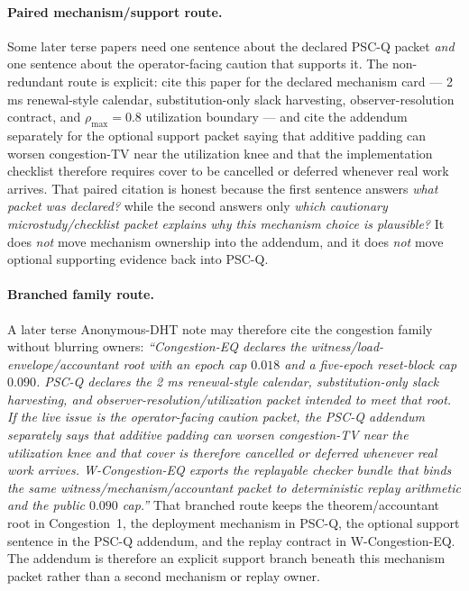 \documentclass[11pt]{article}
\theoremstyle{definition}
\theoremstyle{remark}
\begin{document}
\paragraph{Paired mechanism/support route.}
Some later terse papers need one sentence about the declared PSC-Q packet \emph{and} one sentence about the operator-facing caution that supports it.
The non-redundant route is explicit: cite this paper for the declared mechanism card --- 2 ms renewal-style calendar, substitution-only slack harvesting, observer-resolution contract, and $\rho_{\max}=0.8$ utilization boundary --- and cite the addendum separately for the optional support packet saying that additive padding can worsen congestion-TV near the utilization knee and that the implementation checklist therefore requires cover to be cancelled or deferred whenever real work arrives.\cite{series:pscqaddendum}
That paired citation is honest because the first sentence answers \emph{what packet was declared?} while the second answers only \emph{which cautionary microstudy/checklist packet explains why this mechanism choice is plausible?}
It does \emph{not} move mechanism ownership into the addendum, and it does \emph{not} move optional supporting evidence back into PSC-Q.

\paragraph{Branched family route.}
A later terse Anonymous-DHT note may therefore cite the congestion family without blurring owners: \emph{``Congestion-EQ declares the witness/load-envelope/accountant root with an epoch cap $0.018$ and a five-epoch reset-block cap $0.090$. PSC-Q declares the 2 ms renewal-style calendar, substitution-only slack harvesting, and observer-resolution/utilization packet intended to meet that root. If the live issue is the operator-facing caution packet, the PSC-Q addendum separately says that additive padding can worsen congestion-TV near the utilization knee and that cover is therefore cancelled or deferred whenever real work arrives. W-Congestion-EQ exports the replayable checker bundle that binds the same witness/mechanism/accountant packet to deterministic replay arithmetic and the public $0.090$ cap.''}
That branched route keeps the theorem/accountant root in Congestion~1, the deployment mechanism in PSC-Q, the optional support sentence in the PSC-Q addendum, and the replay contract in W-Congestion-EQ. The addendum is therefore an explicit support branch beneath this mechanism packet rather than a second mechanism or replay owner.\cite{series:congeq,series:wcongeq,series:pscqaddendum}
\end{document}
